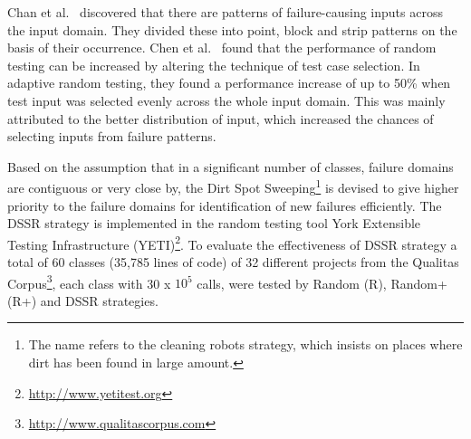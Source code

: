 \documentclass[conference]{IEEEtran}
\begin{document}
Chan et al.~\cite{Chan1996} discovered that there are patterns of failure-causing inputs across the input domain. They divided these into point, block and strip patterns on the basis of their occurrence. Chen et al.~\cite{Chen2008} found that the performance of random testing can be increased by altering the technique of test case selection. In adaptive random testing, they found a performance increase of up to 50\% when test input was selected evenly across the whole input domain. This was mainly attributed to the better distribution of input, which increased the chances of selecting inputs from failure patterns. 

Based on the assumption that in a significant number of classes, failure domains are contiguous or very close by, the Dirt Spot Sweeping\footnote{The name refers to the cleaning robots strategy, which insists on places where dirt has been found in large amount.} is devised to give higher priority to the failure domains for identification of new failures efficiently. 
The DSSR strategy is implemented in the random testing tool York Extensible Testing Infrastructure (YETI)\footnote{\url{http://www.yetitest.org}}. To evaluate the effectiveness of DSSR strategy a total of 60 classes (35,785 lines of code) of 32 different projects from the Qualitas Corpus\footnote{\url{http://www.qualitascorpus.com}}, each class with 30 x ${10^5}$ calls, were tested by Random (R), Random+ (R+) and DSSR strategies.
\end{document}
